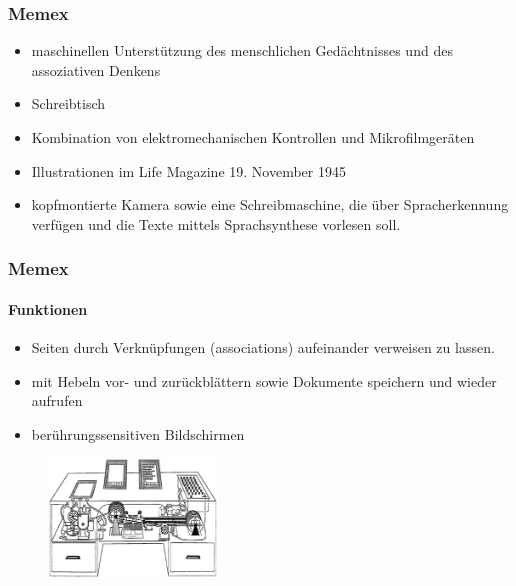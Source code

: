 \begin{frame}
\frametitle{Memex}
\begin{itemize}
	\item maschinellen Unterstützung des menschlichen Gedächtnisses und des assoziativen Denkens
	\item Schreibtisch
	\item Kombination von elektromechanischen Kontrollen und Mikrofilmgeräten
	\item Illustrationen im Life Magazine 19. November 1945
	\item kopfmontierte Kamera sowie eine Schreibmaschine, die über Spracherkennung verfügen und die Texte mittels Sprachsynthese vorlesen soll. 
\end{itemize}
\end{frame}

\begin{frame}
	\frametitle{Memex}
	\framesubtitle{Funktionen}
	\begin{itemize}

		\item Seiten durch Verknüpfungen (associations) aufeinander verweisen zu lassen.
		\item mit Hebeln vor- und zurückblättern sowie Dokumente speichern und wieder aufrufen
		\item berührungssensitiven Bildschirmen 

	\end{itemize}

	\begin{figure}[htbp]
		\centering
		\includegraphics[width=0.4\textwidth]{images/memex}
	\end{figure}

\end{frame}
